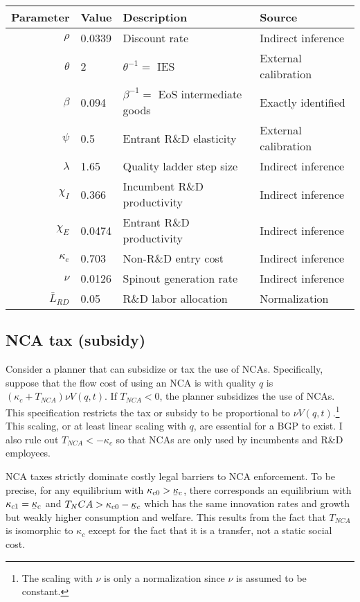 \documentclass[11pt,english]{article}
\newcommand\munderbar[1]{%
	\underaccent{\bar}{#1}}
\theoremstyle{remark}
\begin{document}
\begin{table}[]
	\centering
	\label{calibration_lowEntry_parameters}
	\begin{tabular}{rlll}
		\toprule \toprule
		Parameter & Value & Description & Source \tabularnewline
		\midrule
		$\rho$ & 0.0339 & Discount rate  & Indirect inference \tabularnewline
		$\theta$ & 2 & $\theta^{-1} = $ IES & External calibration 
		\tabularnewline
		$\beta$ & 0.094 & $\beta^{-1} = $ EoS intermediate goods & Exactly identified \tabularnewline 
		$\psi$ & 0.5 & Entrant R\&D elasticity & External calibration \tabularnewline
		$\lambda$ & 1.65 & Quality ladder step size & Indirect inference 
		\tabularnewline
		$\chi_I$ & 0.366 & Incumbent R\&D productivity & Indirect inference 
		\tabularnewline
		$\chi_E$ & 0.0474 & Entrant R\&D productivity & Indirect inference \tabularnewline 
		$\kappa_e$ & 0.703 & Non-R\&D entry cost & Indirect inference \tabularnewline
		$\nu$ & 0.0126 & Spinout generation rate  & Indirect inference\tabularnewline
		$\bar{L}_{RD}$ & 0.05 & R\&D labor allocation  & Normalization \tabularnewline
		\bottomrule
	\end{tabular}
\end{table}

\subsection{NCA tax (subsidy)}

Consider a planner that can subsidize or tax the use of NCAs. Specifically, suppose that the flow cost of using an NCA is with quality $q$ is $(\kappa_c + T_{NCA})\nu  V(q,t)$. If $T_{NCA} < 0$, the planner subsidizes the use of NCAs. This specification restricts the tax or subsidy to be proportional to $\nu V(q,t)$.\footnote{The scaling with $\nu$ is only a normalization since $\nu$ is assumed to be constant.} This scaling, or at least linear scaling with $q$, are essential for a BGP to exist. I also rule out $T_{NCA} < -\kappa_c$ so that NCAs are only used by incumbents and R\&D employees.

NCA taxes strictly dominate costly legal barriers to NCA enforcement. To be precise, for any equilibrium with $\kappa_{c0} > \munderbar{\kappa}_c$, there corresponds an equilibrium with $\kappa_{c1} = \munderbar{\kappa}_c$ and $T_NCA > \kappa_{c0} - \munderbar{\kappa}_c$ which has the same innovation rates and growth but weakly higher consumption and welfare. This results from the fact that $T_{NCA}$ is isomorphic to $\kappa_c$ except for the fact that it is a transfer, not a static social cost. 
\end{document}
